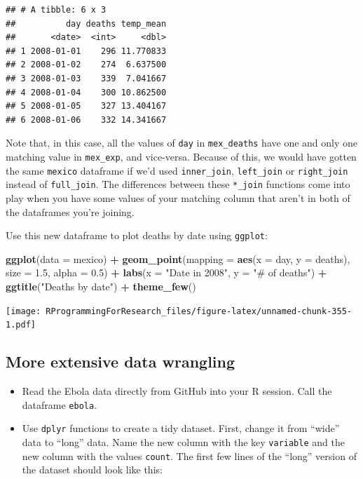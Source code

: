 \documentclass[]{book}
\makeatletter
\newenvironment{Shaded}{\begin{snugshade}}{\end{snugshade}}
\newcommand{\KeywordTok}[1]{\textcolor[rgb]{0.13,0.29,0.53}{\textbf{#1}}}
\newcommand{\DataTypeTok}[1]{\textcolor[rgb]{0.13,0.29,0.53}{#1}}
\newcommand{\FloatTok}[1]{\textcolor[rgb]{0.00,0.00,0.81}{#1}}
\newcommand{\StringTok}[1]{\textcolor[rgb]{0.31,0.60,0.02}{#1}}
\newcommand{\OperatorTok}[1]{\textcolor[rgb]{0.81,0.36,0.00}{\textbf{#1}}}
\newcommand{\NormalTok}[1]{#1}
\providecommand{\tightlist}{%
  \setlength{\itemsep}{0pt}\setlength{\parskip}{0pt}}
\newenvironment{kframe}{%
\medskip{}
\setlength{\fboxsep}{.8em}
 \def\at@end@of@kframe{}%
 \ifinner\ifhmode%
  \def\at@end@of@kframe{\end{minipage}}%
  \begin{minipage}{\columnwidth}%
 \fi\fi%
 \def\FrameCommand##1{\hskip\@totalleftmargin \hskip-\fboxsep
 \colorbox{shadecolor}{##1}\hskip-\fboxsep
     \hskip-\linewidth \hskip-\@totalleftmargin \hskip\columnwidth}%
 \MakeFramed {\advance\hsize-\width
   \@totalleftmargin\z@ \linewidth\hsize
   \@setminipage}}%
 {\par\unskip\endMakeFramed%
 \at@end@of@kframe}
\renewenvironment{Shaded}{\begin{kframe}}{\end{kframe}}
\theoremstyle{definition}
\theoremstyle{definition}
\theoremstyle{definition}
\theoremstyle{remark}
\makeatother
\begin{document}
\begin{verbatim}
## # A tibble: 6 x 3
##          day deaths temp_mean
##       <date>  <int>     <dbl>
## 1 2008-01-01    296 11.770833
## 2 2008-01-02    274  6.637500
## 3 2008-01-03    339  7.041667
## 4 2008-01-04    300 10.862500
## 5 2008-01-05    327 13.404167
## 6 2008-01-06    332 14.341667
\end{verbatim}

Note that, in this case, all the values of \texttt{day} in
\texttt{mex\_deaths} have one and only one matching value in
\texttt{mex\_exp}, and vice-versa. Because of this, we would have gotten
the same \texttt{mexico} dataframe if we'd used \texttt{inner\_join},
\texttt{left\_join} or \texttt{right\_join} instead of
\texttt{full\_join}. The differences between these \texttt{*\_join}
functions come into play when you have some values of your matching
column that aren't in both of the dataframes you're joining.

Use this new dataframe to plot deaths by date using \texttt{ggplot}:

\begin{Shaded}
\begin{Highlighting}[]
\KeywordTok{ggplot}\NormalTok{(}\DataTypeTok{data =}\NormalTok{ mexico) }\OperatorTok{+}\StringTok{ }
\StringTok{        }\KeywordTok{geom_point}\NormalTok{(}\DataTypeTok{mapping =} \KeywordTok{aes}\NormalTok{(}\DataTypeTok{x =}\NormalTok{ day, }\DataTypeTok{y =}\NormalTok{ deaths),}
                   \DataTypeTok{size =} \FloatTok{1.5}\NormalTok{, }\DataTypeTok{alpha =} \FloatTok{0.5}\NormalTok{) }\OperatorTok{+}\StringTok{ }
\StringTok{        }\KeywordTok{labs}\NormalTok{(}\DataTypeTok{x =} \StringTok{"Date in 2008"}\NormalTok{, }\DataTypeTok{y =} \StringTok{"# of deaths"}\NormalTok{) }\OperatorTok{+}\StringTok{ }
\StringTok{        }\KeywordTok{ggtitle}\NormalTok{(}\StringTok{"Deaths by date"}\NormalTok{) }\OperatorTok{+}\StringTok{ }
\StringTok{        }\KeywordTok{theme_few}\NormalTok{() }
\end{Highlighting}
\end{Shaded}

\texttt{[image: RProgrammingForResearch\_files/figure-latex/unnamed-chunk-355-1.pdf]}

\subsection{More extensive data
wrangling}\label{more-extensive-data-wrangling}

\begin{itemize}
\tightlist
\item
  Read the Ebola data directly from GitHub into your R session. Call the
  dataframe \texttt{ebola}.
\item
  Use \texttt{dplyr} functions to create a tidy dataset. First, change
  it from ``wide'' data to ``long'' data. Name the new column with the
  key \texttt{variable} and the new column with the values
  \texttt{count}. The first few lines of the ``long'' version of the
  dataset should look like this:
\end{itemize}
\end{document}
